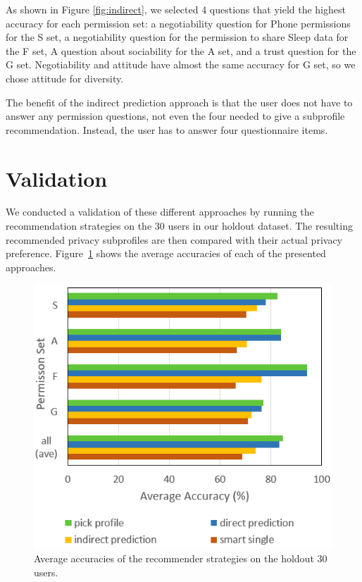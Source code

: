 As shown in Figure \ref{fig:indirect}, we selected 4 questions that yield the highest accuracy for each permission set: a negotiability question for Phone permissions for the S set, a negotiability question for the permission to share Sleep data for the F set, A question about sociability for the A set, and a trust question for the G set. %
Negotiability and attitude have almost the same accuracy for G set, so we chose attitude for diversity.

The benefit of the indirect prediction approach is that the user does not have to answer any permission questions, not even the four needed to give a subprofile recommendation. Instead, the user has to answer four questionnaire items. 



\section{Validation}
We conducted a validation of these different approaches by running the recommendation strategies on the 30 users in our holdout dataset. The resulting recommended privacy subprofiles are then compared with their actual privacy preference. Figure~\ref{fig:aveaccuracy} shows the average accuracies of each of the presented approaches.

\begin{figure}[ht]
	\includegraphics[width=0.5\textheight]{figures/aveaccuracy4.png}
	\caption{Average accuracies of the recommender strategies on the holdout 30 users.}
	\label{fig:aveaccuracy}      
\end{figure}

